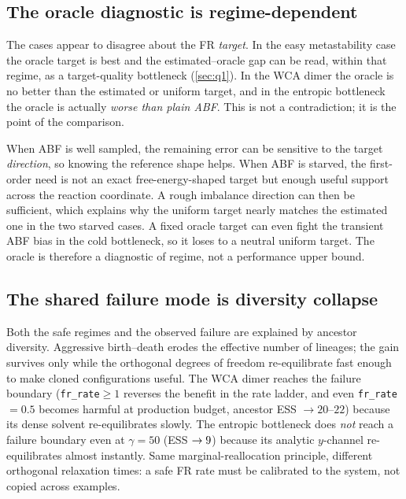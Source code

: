 \subsection{The oracle diagnostic is regime-dependent}
The cases appear to disagree about the FR \emph{target}. In the easy metastability
case the oracle target is best and the estimated--oracle gap can be read, within
that regime, as a target-quality bottleneck (\cref{sec:q1}). In the WCA dimer the
oracle is no better than the estimated or uniform target, and in the entropic
bottleneck the oracle is actually \emph{worse than plain ABF}. This is not a
contradiction; it is the point of the comparison.

When ABF is well sampled, the remaining error can be sensitive to the target
\emph{direction}, so knowing the reference shape helps. When ABF is starved, the
first-order need is not an exact free-energy-shaped target but enough useful
support across the reaction coordinate. A rough imbalance direction can then be
sufficient, which explains why the uniform target nearly matches the estimated one
in the two starved cases. A fixed oracle target can even fight the transient ABF
bias in the cold bottleneck, so it loses to a neutral uniform target. The oracle is
therefore a diagnostic of regime, not a performance upper bound.

\subsection{The shared failure mode is diversity collapse}
Both the safe regimes and the observed failure are explained by ancestor
diversity. Aggressive birth--death erodes the effective number of lineages; the
gain survives only while the orthogonal degrees of freedom re-equilibrate fast
enough to make cloned configurations useful. The WCA dimer reaches the failure
boundary (\texttt{fr\_rate}$\ge1$ reverses the benefit in the rate ladder, and even
\texttt{fr\_rate}$=0.5$ becomes harmful at production budget, ancestor ESS
$\to\!20$--$22$) because its dense solvent re-equilibrates slowly. The entropic
bottleneck does \emph{not} reach a failure boundary even at $\gamma=50$ (ESS
$\to9$) because its analytic $y$-channel re-equilibrates almost instantly.
Same marginal-reallocation principle, different orthogonal relaxation times: a
safe FR rate must be calibrated to the system, not copied across examples.
